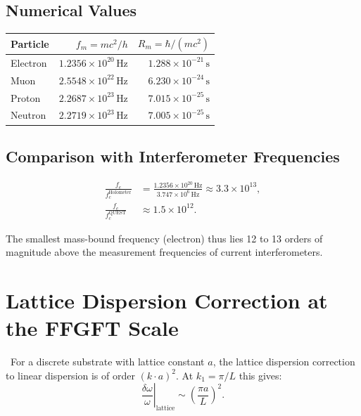 \subsection{Numerical Values}

\KM

\begin{kernbox}[title={Compton frequencies of stable particles (SI)}]
\begin{center}
\begin{tabular}{lrr}
\toprule
Particle & $f_m = mc^2/h$ & $R_m = \hbar/(mc^2)$ \\
\midrule
Electron  & $1.2356\times10^{20}\,\text{Hz}$ & $1.288\times10^{-21}\,\text{s}$ \\
Muon      & $2.5548\times10^{22}\,\text{Hz}$ & $6.230\times10^{-24}\,\text{s}$ \\
Proton    & $2.2687\times10^{23}\,\text{Hz}$ & $7.015\times10^{-25}\,\text{s}$ \\
Neutron   & $2.2719\times10^{23}\,\text{Hz}$ & $7.005\times10^{-25}\,\text{s}$ \\
\bottomrule
\end{tabular}
\end{center}
\end{kernbox}

\subsection{Comparison with Interferometer Frequencies}

\KM
\begin{align}
\frac{f_e}{f_c^\text{Holometer}} &= \frac{1.2356\times10^{20}\,\text{Hz}}{3.747\times10^{6}\,\text{Hz}}
\approx 3.3\times10^{13}, \\
\frac{f_e}{f_c^\text{QUEST}} &\approx 1.5\times10^{12}.
\end{align}

The smallest mass-bound frequency (electron) thus lies 12 to 13 orders of
magnitude above the measurement frequencies of current interferometers.

\section{Lattice Dispersion Correction at the FFGFT Scale}

\KM\ For a discrete substrate with lattice constant $a$, the lattice dispersion
correction to linear dispersion is of order $(k\cdot a)^2$. At
$k_1 = \pi/L$ this gives:
\begin{equation}
\left.\frac{\delta\omega}{\omega}\right|_\text{lattice} \sim \left(\frac{\pi a}{L}\right)^2.
\end{equation}

